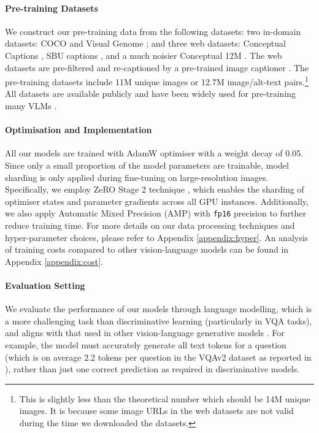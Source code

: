 \documentclass[11pt]{article}
\begin{document}
{\paragraph{Pre-training Datasets} We construct our pre-training data from the following datasets: two in-domain datasets: COCO \cite{lin2014coco} and Visual Genome \cite{krishna17visualgenome}; and three web datasets: Conceptual Captions \cite{sharma2018cc3m}, SBU captions \cite{ordonez2011sbu_caption}, and a much noisier Conceptual 12M \cite{changpinyo2021cc12m}. The web datasets are pre-filtered and re-captioned by a pre-trained image captioner \cite{li2022blip}. The pre-training datasets include 11M unique images or 12.7M image/alt-text pairs.\footnote{This is slightly less than the theoretical number which should be 14M unique images. It is because some image URLs in the web datasets are not valid during the time we downloaded the datasets.} All datasets are available publicly and have been widely used for pre-training many VLMs \cite{li2021albef,li2022blip,chen2020uniter}. 


\paragraph{Optimisation and Implementation} All our models are trained with AdamW optimiser \cite{loshchilov2018adamw} with a weight decay of 0.05. Since only a small proportion of the model parameters are trainable, model sharding is only applied during fine-tuning on large-resolution images. Specifically, we employ ZeRO Stage 2 technique \cite{rajbhandari2020zero}, which enables the sharding of optimiser states and parameter gradients across all GPU instances. Additionally, we also apply Automatic Mixed Precision (AMP) with {\tt fp16} precision to further reduce training time. For more details on our data processing techniques and hyper-parameter choices, please refer to Appendix \ref{appendix:hyper}. An analysis of training costs compared to other vision-language models can be found in Appendix \ref{appendix:cost}.

\paragraph{Evaluation Setting} We evaluate the performance of our models through language modelling, which is a more challenging task than discriminative learning (particularly in VQA tasks), and aligns with that used in other vision-language generative models \cite{li2022blip,alayrac2022flamingo,wang2022git,chen2022pali}. For example, the model must accurately generate all text tokens for a question (which is on average 2.2 tokens per question in the VQAv2 dataset \cite{antol2015vqa} as reported in \cite{wang2022git}), rather than just one correct prediction as required in discriminative models. 


}
\end{document}
